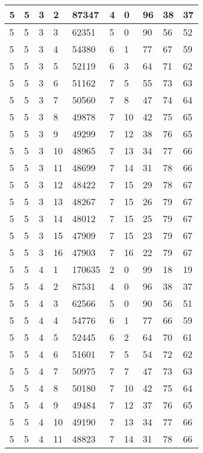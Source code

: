 \begin{table}[!ht]
\begin{tabular}{|l|l|l|l|l|l|l|l|l|l|}
        5 & 5 & 3 & 2 & 87347 & 4 & 0 & 96 & 38 & 37 \\ \hline
        5 & 5 & 3 & 3 & 62351 & 5 & 0 & 90 & 56 & 52 \\ \hline
        5 & 5 & 3 & 4 & 54380 & 6 & 1 & 77 & 67 & 59 \\ \hline
        5 & 5 & 3 & 5 & 52119 & 6 & 3 & 64 & 71 & 62 \\ \hline
        5 & 5 & 3 & 6 & 51162 & 7 & 5 & 55 & 73 & 63 \\ \hline
        5 & 5 & 3 & 7 & 50560 & 7 & 8 & 47 & 74 & 64 \\ \hline
        5 & 5 & 3 & 8 & 49878 & 7 & 10 & 42 & 75 & 65 \\ \hline
        5 & 5 & 3 & 9 & 49299 & 7 & 12 & 38 & 76 & 65 \\ \hline
        5 & 5 & 3 & 10 & 48965 & 7 & 13 & 34 & 77 & 66 \\ \hline
        5 & 5 & 3 & 11 & 48699 & 7 & 14 & 31 & 78 & 66 \\ \hline
        5 & 5 & 3 & 12 & 48422 & 7 & 15 & 29 & 78 & 67 \\ \hline
        5 & 5 & 3 & 13 & 48267 & 7 & 15 & 26 & 79 & 67 \\ \hline
        5 & 5 & 3 & 14 & 48012 & 7 & 15 & 25 & 79 & 67 \\ \hline
        5 & 5 & 3 & 15 & 47909 & 7 & 15 & 23 & 79 & 67 \\ \hline
        5 & 5 & 3 & 16 & 47903 & 7 & 16 & 22 & 79 & 67 \\ \hline
        5 & 5 & 4 & 1 & 170635 & 2 & 0 & 99 & 18 & 19 \\ \hline
        5 & 5 & 4 & 2 & 87531 & 4 & 0 & 96 & 38 & 37 \\ \hline
        5 & 5 & 4 & 3 & 62566 & 5 & 0 & 90 & 56 & 51 \\ \hline
        5 & 5 & 4 & 4 & 54776 & 6 & 1 & 77 & 66 & 59 \\ \hline
        5 & 5 & 4 & 5 & 52445 & 6 & 2 & 64 & 70 & 61 \\ \hline
        5 & 5 & 4 & 6 & 51601 & 7 & 5 & 54 & 72 & 62 \\ \hline
        5 & 5 & 4 & 7 & 50975 & 7 & 7 & 47 & 73 & 63 \\ \hline
        5 & 5 & 4 & 8 & 50180 & 7 & 10 & 42 & 75 & 64 \\ \hline
        5 & 5 & 4 & 9 & 49484 & 7 & 12 & 37 & 76 & 65 \\ \hline
        5 & 5 & 4 & 10 & 49190 & 7 & 13 & 34 & 77 & 66 \\ \hline
        5 & 5 & 4 & 11 & 48823 & 7 & 14 & 31 & 78 & 66 \\ \hline

\end{tabular}
\end{table}
